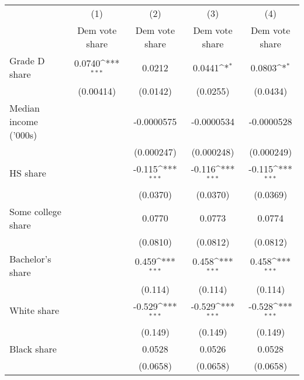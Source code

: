 {
\def\sym#1{\ifmmode^{#1}\else\(^{#1}\)\fi}
\begin{tabular}{l*{4}{c}}
\toprule
                    &\multicolumn{1}{c}{(1)}&\multicolumn{1}{c}{(2)}&\multicolumn{1}{c}{(3)}&\multicolumn{1}{c}{(4)}\\
                    &\multicolumn{1}{c}{Dem vote share}&\multicolumn{1}{c}{Dem vote share}&\multicolumn{1}{c}{Dem vote share}&\multicolumn{1}{c}{Dem vote share}\\
\midrule
Grade D share       &      0.0740\sym{***}&      0.0212         &      0.0441\sym{*}  &      0.0803\sym{*}  \\
                    &   (0.00414)         &    (0.0142)         &    (0.0255)         &    (0.0434)         \\
\addlinespace
Median income ('000s)&                     &  -0.0000575         &  -0.0000534         &  -0.0000528         \\
                    &                     &  (0.000247)         &  (0.000248)         &  (0.000249)         \\
\addlinespace
HS share            &                     &      -0.115\sym{***}&      -0.116\sym{***}&      -0.115\sym{***}\\
                    &                     &    (0.0370)         &    (0.0370)         &    (0.0369)         \\
\addlinespace
Some college share  &                     &      0.0770         &      0.0773         &      0.0774         \\
                    &                     &    (0.0810)         &    (0.0812)         &    (0.0812)         \\
\addlinespace
Bachelor's share    &                     &       0.459\sym{***}&       0.458\sym{***}&       0.458\sym{***}\\
                    &                     &     (0.114)         &     (0.114)         &     (0.114)         \\
\addlinespace
White share         &                     &      -0.529\sym{***}&      -0.529\sym{***}&      -0.528\sym{***}\\
                    &                     &     (0.149)         &     (0.149)         &     (0.149)         \\
\addlinespace
Black share         &                     &      0.0528         &      0.0526         &      0.0528         \\
                    &                     &    (0.0658)         &    (0.0658)         &    (0.0658)         \\

\end{tabular}}
